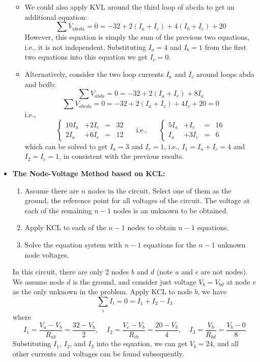 \begin{itemize}
\begin{itemize}
  \item We could also apply KVL around the third loop of abcda to get an
    additional equation:
    \[ 
    \sum V_{abcda}=0=-32+2(I_a+I_c)+4(I_b+I_c)+20 
    \]
    However, this equation is simply the sum of the previous two equations,
    i.e., it is not independent. Substituting $I_a=4$ and $I_b=1$ from the
    first two equations into this equation we get $I_c=0$.

  \item Alternatively, consider the two loop currents $I_a$ and $I_c$ around 
    loops abda and bcdb:
    \[ \sum V_{abda} =0=-32+2(I_a+I_c)+8I_a   \]
    \[ \sum V_{abcda}=0=-32+2(I_a+I_c)+4I_c+20=0  \]
    i.e.,
    \[
    \left\{ \begin{array}{rrrr} 10I_a&+2I_c&=&32 \\ 2I_a &+6I_c&=&12
    \end{array} \right. \;\;\;\;\;\mbox{i.e.,}\;\;\;\;\;\;
    \left\{ \begin{array}{rrrr} 5I_a&+I_c&=&16 \\ I_a &+3I_c&=&6
    \end{array} \right. 
    \]
    which can be solved to get $I_a=3$ and $I_c=1$, i.e., $I_1=I_a+I_c=4$
    and $I_2=I_c=1$, in consistent with the previous results.

  \end{itemize}

\item {\bf The Node-Voltage Method based on KCL:}

  \begin{enumerate} 
  \item Assume there are $n$ nodes in the circuit. Select one of them as
    the ground, the reference point for all voltages of the circuit.
    The voltage at each of the remaining $n-1$ nodes is an unknown to be 
    obtained.
  \item Apply KCL to each of the $n-1$ nodes to obtain $n-1$ equations. 
  \item Solve the equation system with $n-1$ equations for the $n-1$
    unknown node voltages.
  \end{enumerate}

  In this circuit, there are only 2 nodes $b$ and $d$ (note $a$ and $c$ are
  not nodes). We assume node $d$ is the ground, and consider just voltage
  $V_b=V_{bd}$ at node $v$ as the only unknown in the problem. Apply KCL to 
  node $b$, we have
  \[	\sum_i I_i=0=I_1+I_2-I_3	\]
  where
  \[
  I_1=\frac{V_a-V_b}{R_{ab}}=\frac{32-V_b}{2},\;\;\;\;
  I_2=\frac{V_c-V_b}{R_{cb}}=\frac{20-V_b}{4},\;\;\;\;
  I_3=\frac{V_b}{R_{bd}}=\frac{V_b-0}{8}  
  \]
  Substituting $I_1$, $I_2$, and $I_3$ into the equation, we can get $V_b=24$, 
  and all other currents and voltages can be found subsequently.


\end{itemize}
